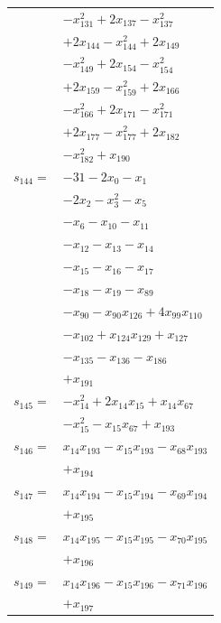 \begin{longtable}{@{}r@{\;}l@{}}
 & \(\displaystyle -x_{131}^{2} +2x_{137} -x_{137}^{2}\) \\
 & \(\displaystyle +2x_{144} -x_{144}^{2} +2x_{149}\) \\
 & \(\displaystyle -x_{149}^{2} +2x_{154} -x_{154}^{2}\) \\
 & \(\displaystyle +2x_{159} -x_{159}^{2} +2x_{166}\) \\
 & \(\displaystyle -x_{166}^{2} +2x_{171} -x_{171}^{2}\) \\
 & \(\displaystyle +2x_{177} -x_{177}^{2} +2x_{182}\) \\
 & \(\displaystyle -x_{182}^{2} +x_{190}\) \\[3pt]
\(s_{144}=\) & \(\displaystyle -31 -2x_{0} -x_{1}\) \\
 & \(\displaystyle -2x_{2} -x_{3}^{2} -x_{5}\) \\
 & \(\displaystyle -x_{6} -x_{10} -x_{11}\) \\
 & \(\displaystyle -x_{12} -x_{13} -x_{14}\) \\
 & \(\displaystyle -x_{15} -x_{16} -x_{17}\) \\
 & \(\displaystyle -x_{18} -x_{19} -x_{89}\) \\
 & \(\displaystyle -x_{90} -x_{90}x_{126} +4x_{99}x_{110}\) \\
 & \(\displaystyle -x_{102} +x_{124}x_{129} +x_{127}\) \\
 & \(\displaystyle -x_{135} -x_{136} -x_{186}\) \\
 & \(\displaystyle +x_{191}\) \\[3pt]
\(s_{145}=\) & \(\displaystyle -x_{14}^{2} +2x_{14}x_{15} +x_{14}x_{67}\) \\
 & \(\displaystyle -x_{15}^{2} -x_{15}x_{67} +x_{193}\) \\[3pt]
\(s_{146}=\) & \(\displaystyle x_{14}x_{193} -x_{15}x_{193} -x_{68}x_{193}\) \\
 & \(\displaystyle +x_{194}\) \\[3pt]
\(s_{147}=\) & \(\displaystyle x_{14}x_{194} -x_{15}x_{194} -x_{69}x_{194}\) \\
 & \(\displaystyle +x_{195}\) \\[3pt]
\(s_{148}=\) & \(\displaystyle x_{14}x_{195} -x_{15}x_{195} -x_{70}x_{195}\) \\
 & \(\displaystyle +x_{196}\) \\[3pt]
\(s_{149}=\) & \(\displaystyle x_{14}x_{196} -x_{15}x_{196} -x_{71}x_{196}\) \\
 & \(\displaystyle +x_{197}\) \\[3pt]

\end{longtable}

